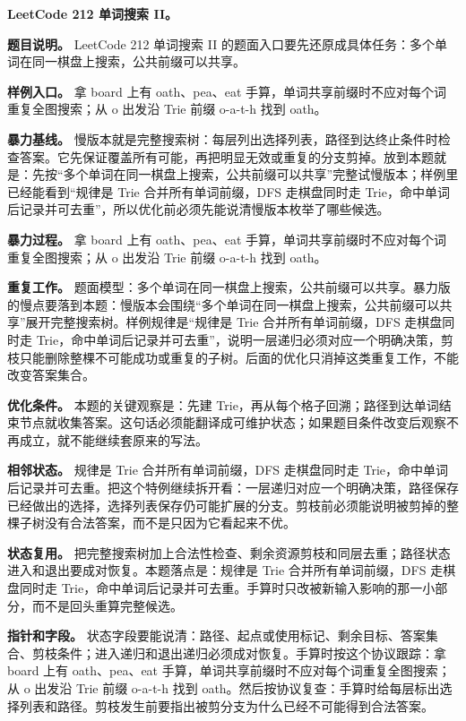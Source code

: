 \noindent\textbf{LeetCode 212 单词搜索 II。}

\textbf{题目说明。} LeetCode 212 单词搜索 II 的题面入口要先还原成具体任务：多个单词在同一棋盘上搜索，公共前缀可以共享。

\textbf{样例入口。} 拿 board 上有 oath、pea、eat 手算，单词共享前缀时不应对每个词重复全图搜索；从 o 出发沿 Trie 前缀 o-a-t-h 找到 oath。

\textbf{暴力基线。} 慢版本就是完整搜索树：每层列出选择列表，路径到达终止条件时检查答案。它先保证覆盖所有可能，再把明显无效或重复的分支剪掉。放到本题就是：先按“多个单词在同一棋盘上搜索，公共前缀可以共享”完整试慢版本；样例里已经能看到“规律是 Trie 合并所有单词前缀，DFS 走棋盘同时走 Trie，命中单词后记录并可去重”，所以优化前必须先能说清慢版本枚举了哪些候选。

\textbf{暴力过程。} 拿 board 上有 oath、pea、eat 手算，单词共享前缀时不应对每个词重复全图搜索；从 o 出发沿 Trie 前缀 o-a-t-h 找到 oath。

\textbf{重复工作。} 题面模型：多个单词在同一棋盘上搜索，公共前缀可以共享。暴力版的慢点要落到本题：慢版本会围绕“多个单词在同一棋盘上搜索，公共前缀可以共享”展开完整搜索树。样例规律是“规律是 Trie 合并所有单词前缀，DFS 走棋盘同时走 Trie，命中单词后记录并可去重”，说明一层递归必须对应一个明确决策，剪枝只能删除整棵不可能成功或重复的子树。后面的优化只消掉这类重复工作，不能改变答案集合。

\textbf{优化条件。} 本题的关键观察是：先建 Trie，再从每个格子回溯；路径到达单词结束节点就收集答案。这句话必须能翻译成可维护状态；如果题目条件改变后观察不再成立，就不能继续套原来的写法。

\textbf{相邻状态。} 规律是 Trie 合并所有单词前缀，DFS 走棋盘同时走 Trie，命中单词后记录并可去重。把这个特例继续拆开看：一层递归对应一个明确决策，路径保存已经做出的选择，选择列表保存仍可能扩展的分支。剪枝前必须能说明被剪掉的整棵子树没有合法答案，而不是只因为它看起来不优。

\textbf{状态复用。} 把完整搜索树加上合法性检查、剩余资源剪枝和同层去重；路径状态进入和退出要成对恢复。本题落点是：规律是 Trie 合并所有单词前缀，DFS 走棋盘同时走 Trie，命中单词后记录并可去重。手算时只改被新输入影响的那一小部分，而不是回头重算完整候选。

\textbf{指针和字段。} 状态字段要能说清：路径、起点或使用标记、剩余目标、答案集合、剪枝条件；进入递归和退出递归必须成对恢复。手算时按这个协议跟踪：拿 board 上有 oath、pea、eat 手算，单词共享前缀时不应对每个词重复全图搜索；从 o 出发沿 Trie 前缀 o-a-t-h 找到 oath。然后按协议复查：手算时给每层标出选择列表和路径。剪枝发生前要指出被剪分支为什么已经不可能得到合法答案。

